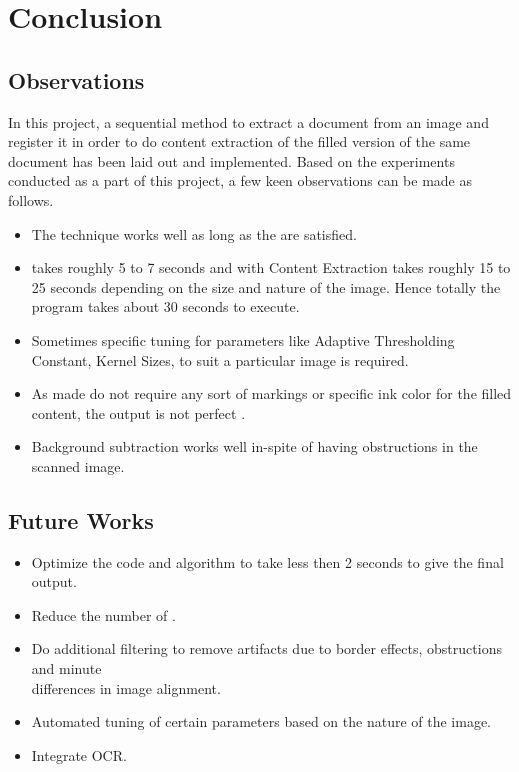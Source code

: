 
\chapter{Conclusion} %

\label{Chapter4} %



\section{Observations}
In this project, a sequential method to extract a document from an image and register it in order to do content extraction of the filled version of the same document has been laid out and implemented. Based on the experiments conducted as a part of this project, a few keen observations can be made as follows.
\begin{itemize}
	\item The technique works well as long as the  are satisfied.
	\item {} takes roughly 5 to 7 seconds and  with Content Extraction takes roughly 15 to 25 seconds depending on the size and nature of the image. Hence totally the program takes about 30 seconds to execute.
	\item Sometimes specific tuning for parameters like Adaptive Thresholding Constant, Kernel Sizes, to suit a particular image is required.
	\item As  made do not require any sort of markings or specific ink color for the filled content, the output is not perfect .
	\item Background subtraction works well in-spite of having obstructions in the scanned image.
\end{itemize}

\section{Future Works}

\begin{itemize}
	\item Optimize the code and algorithm to take less then 2 seconds to give the final output.
	\item Reduce the number of   .
	\item Do additional filtering to remove artifacts due to border effects, obstructions and minute \\differences in image alignment.
	\item Automated tuning of certain parameters based on the nature of the image.
	\item Integrate OCR.
\end{itemize}


